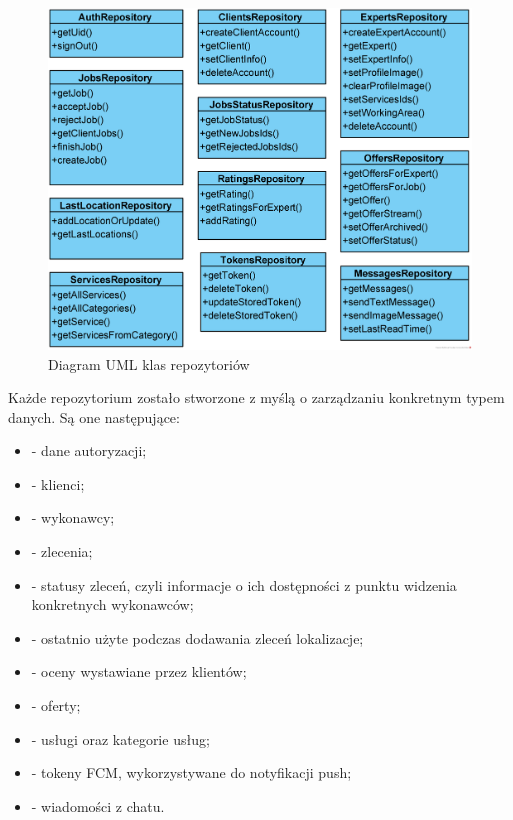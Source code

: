 \begin{figure}[ht!]
  \centering
  \includegraphics[width=\linewidth]{images/repositories.png}
  \caption{Diagram UML klas repozytoriów}
  \label{fig:repos}
\end{figure}

Każde repozytorium zostało stworzone z myślą o zarządzaniu konkretnym typem danych. Są one następujące:
\begin{itemize}
    \item \textbf{} - dane autoryzacji;
    \item \textbf{} - klienci;
    \item \textbf{} - wykonawcy;
    \item \textbf{} - zlecenia;
    \item \textbf{} - statusy zleceń, czyli informacje o ich dostępności z punktu widzenia konkretnych wykonawców;
    \item \textbf{} - ostatnio użyte podczas dodawania zleceń lokalizacje;
    \item \textbf{} - oceny wystawiane przez klientów;
    \item \textbf{} - oferty;
    \item \textbf{} - usługi oraz kategorie usług;
    \item \textbf{} - tokeny FCM, wykorzystywane do notyfikacji push;
    \item \textbf{} - wiadomości z chatu.
\end{itemize}

